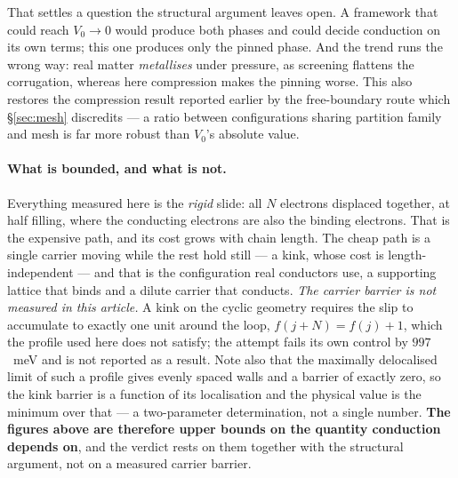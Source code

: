 \documentclass[11pt]{article}
\begin{document}
That settles a question the structural argument leaves open. A framework that could reach $V_0\to0$
would produce both phases and could decide conduction on its own terms; this one produces only the
pinned phase. And the trend runs the wrong way: real matter \emph{metallises} under pressure, as
screening flattens the corrugation, whereas here compression makes the pinning worse. This also
restores the compression result reported earlier by the free-boundary route which
\S\ref{sec:mesh} discredits --- a ratio between configurations sharing partition family and mesh is
far more robust than $V_0$'s absolute value.

\paragraph{What is bounded, and what is not.} Everything measured here is the \emph{rigid} slide:
all $N$ electrons displaced together, at half filling, where the conducting electrons are also the
binding electrons. That is the expensive path, and its cost grows with chain length. The cheap path
is a single carrier moving while the rest hold still --- a kink, whose cost is length-independent
--- and that is the configuration real conductors use, a supporting lattice that binds and a dilute
carrier that conducts. \emph{The carrier barrier is not measured in this article.} A kink on the
cyclic geometry requires the slip to accumulate to exactly one unit around the loop,
$f(j+N)=f(j)+1$, which the profile used here does not satisfy; the attempt fails its own control by
$997$~meV and is not reported as a result. Note also that the maximally delocalised limit of such a
profile gives evenly spaced walls and a barrier of exactly zero, so the kink barrier is a function
of its localisation and the physical value is the minimum over that --- a two-parameter
determination, not a single number. \textbf{The figures above are therefore upper bounds on the
quantity conduction depends on}, and the verdict rests on them together with the structural
argument, not on a measured carrier barrier.
\end{document}
